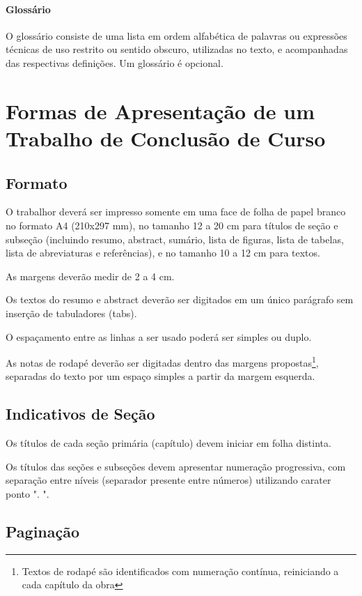 \documentclass[repeatfields,xlists,xpacks,oneside,yearsonly]{ufrgscca}
\begin{document}
\subsubsection{Glossário}

O glossário consiste de uma lista em ordem alfabética de palavras ou
expressões técnicas de uso restrito ou sentido obscuro, utilizadas no texto,
e acompanhadas das respectivas definições. Um glossário é opcional.

\chapter{Formas de Apresentação de um Trabalho de Conclusão de Curso}
\label{formas}

\section{Formato}

O trabalhor deverá ser impresso somente em uma face de folha de papel
branco no formato A4 (210x297 mm), no tamanho 12 a 20 cm para títulos de
seção e subseção (incluindo resumo, abstract, sumário, lista de figuras,
lista de tabelas, lista de abreviaturas e referências), e no tamanho 10 a 12
cm para textos.

As margens deverão medir de 2 a 4 cm.

Os textos do resumo e abstract deverão ser digitados em um único parágrafo
sem inserção de tabuladores (tabs).

O espaçamento entre as linhas a ser usado poderá ser simples ou duplo.

As notas de rodapé deverão ser digitadas dentro das margens
propostas\footnote{Textos de rodapé são identificados com numeração
contínua, reiniciando a cada capítulo da obra}, separadas do texto por um
espaço simples a partir da margem esquerda.

\section{Indicativos de Seção}

Os títulos de cada seção primária (capítulo) devem iniciar em folha
distinta.

Os títulos das seções e subseções devem apresentar numeração progressiva,
com separação entre níveis (separador presente entre números) utilizando
carater ponto ". ".

\section{Paginação}
\end{document}
